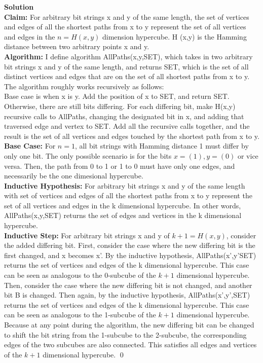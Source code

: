 \documentclass[11pt]{article}
\newenvironment{Parts}{\begin{enumerate}[label=(\alph*)]}{\end{enumerate}}
\begin{document}
\begin{Parts}
\begin{mdframed} \textbf{Solution} \\
\textbf{Claim: }For arbitrary bit strings x and y of the same length, the set of vertices and edges of all the 
shortest paths from x to y represent the set of all vertices and edges in the $n=H(x,y)$ dimension hypercube. H
(x,y) is the Hamming distance between two arbitrary points x and y. \\
\textbf{Algorithm: }I define algorithm AllPaths(x,y,SET), which takes in two arbitrary bit strings x and y of 
the same length, and returns SET, which is the set of all distinct vertices and edges that are on the set of all 
shortest paths from x to y. The algorithm roughly works recursively as follows: \\
Base case is when x is y. Add the position of x to SET, and return SET. \\
Otherwise, there are still bits differing. For each differing bit, make H(x,y) recursive calls to AllPaths, 
changing the designated bit in x, and adding that traversed edge and vertex to SET. Add all the recursive calls 
together, and the result is the set of all vertices and edges touched by the shortest path from x to y. \\
\textbf{Base Case: }For $n=1$, all bit strings with Hamming distance 1 must differ by only one bit. The only 
possible scenario is for the bits $x=(1),y=(0)$ or vice versa. Then, the path from 0 to 1 or 1 to 0 must have 
only one edges, and necessarily be the one dimesional hypercube. \\
\textbf{Inductive Hypothesis: }For arbitrary bit strings x and y of the same length with %
set of vertices and edges of all the shortest paths from x to y represent the set of all vertices and edges in 
the k dimensional hypercube. In other words, AllPaths(x,y,SET) returns the set of edges and vertices in the k 
dimensional hypercube.\\
\textbf{Inductive Step: }For arbitrary bit strings x and y of $k+1=H(x,y)$, consider the added differing bit. 
First, consider the case where the new differing bit is the first changed, and x becomes x'. By the inductive 
hypothesis, AllPaths(x',y'SET) returns the set of vertices and edges of the k dimensional hypercube. This case 
can be seen as analogous to the 0-subcube of the $k+1$ dimensional hypercube. Then, consider the case where the 
new differing bit is not changed, and another bit B is changed. Then again, by the inductive hypothesis, 
AllPaths(x',y',SET) returns the set of vertices and edges of the k dimensional hypercube. This case can be seen 
as analogous to the 1-subcube of the $k+1$ dimensional hypercube. Because at any point during the algorithm, the 
new differing bit can be changed to shift the bit string from the 1-subcube to the 2-subcube, the corresponding 
edges of the two subcubes are also connected. This satisfies all edges and vertices of the $k+1$ dimensional 
hypercube. \qed
\end{mdframed}


\end{Parts}
\end{document}
